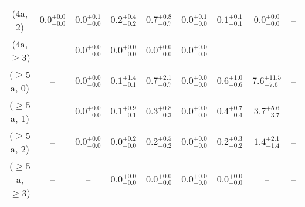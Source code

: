 \begin{table}[h!]
{\begin{tabular}{ccccccccc}
	(4a, 2) & $0.0^{+ 0.0 }_{- 0.0 }$ & $0.0^{+ 0.1 }_{- 0.0 }$ & $0.2^{+ 0.4 }_{- 0.2 }$ & $0.7^{+ 0.8 }_{- 0.7 }$ & $0.0^{+ 0.1 }_{- 0.0 }$ & $0.1^{+ 0.1 }_{- 0.1 }$ & $0.0^{+ 0.0 }_{- 0.0 }$ & -- \\[0.5ex] 
	(4a, $\ge3$) & -- & $0.0^{+ 0.0 }_{- 0.0 }$ & $0.0^{+ 0.0 }_{- 0.0 }$ & $0.0^{+ 0.0 }_{- 0.0 }$ & $0.0^{+ 0.0 }_{- 0.0 }$ & -- & -- & -- \\[0.5ex] 
	($\ge5$a, 0) & -- & $0.0^{+ 0.0 }_{- 0.0 }$ & $0.1^{+ 1.4 }_{- 0.1 }$ & $0.7^{+ 2.1 }_{- 0.7 }$ & $0.0^{+ 0.0 }_{- 0.0 }$ & $0.6^{+ 1.0 }_{- 0.6 }$ & $7.6^{+ 11.5 }_{- 7.6 }$ & -- \\[0.5ex] 
	($\ge5$a, 1) & -- & $0.0^{+ 0.0 }_{- 0.0 }$ & $0.1^{+ 0.9 }_{- 0.1 }$ & $0.3^{+ 0.8 }_{- 0.3 }$ & $0.0^{+ 0.0 }_{- 0.0 }$ & $0.4^{+ 0.7 }_{- 0.4 }$ & $3.7^{+ 5.6 }_{- 3.7 }$ & -- \\[0.5ex] 
	($\ge5$a, 2) & -- & $0.0^{+ 0.0 }_{- 0.0 }$ & $0.0^{+ 0.2 }_{- 0.0 }$ & $0.2^{+ 0.5 }_{- 0.2 }$ & $0.0^{+ 0.0 }_{- 0.0 }$ & $0.2^{+ 0.3 }_{- 0.2 }$ & $1.4^{+ 2.1 }_{- 1.4 }$ & -- \\[0.5ex] 
	($\ge5$a, $\ge3$) & -- & -- & $0.0^{+ 0.0 }_{- 0.0 }$ & $0.0^{+ 0.0 }_{- 0.0 }$ & $0.0^{+ 0.0 }_{- 0.0 }$ & $0.0^{+ 0.0 }_{- 0.0 }$ & -- & -- \\[0.5ex] 
	\hline
	\hline
\end{tabular}}
\end{table}
